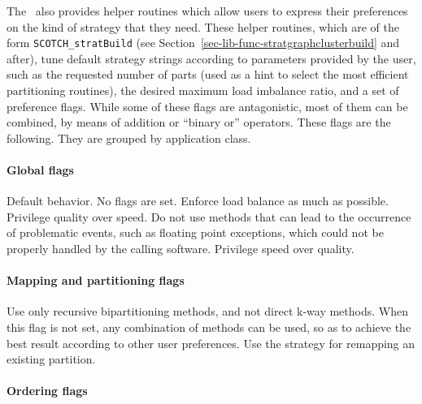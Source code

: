 The \libscotch\ also provides helper routines which allow users to
express their preferences on the kind of strategy that they
need. These helper routines, which are of the form
{\tt SCOTCH\_\lbt strat\lbt *\lbt Build} (see
Section~\ref{sec-lib-func-stratgraphclusterbuild} and after), tune
default strategy strings according to parameters provided by the user,
such as the requested number of parts (used as a hint to select the
most efficient partitioning routines), the desired maximum load
imbalance ratio, and a set of preference flags. While some of these
flags are antagonistic, most of them can be combined, by means of
addition or ``binary or'' operators. These flags are the following.
They are grouped by application class.

\paragraph{Global flags}

\begin{itemize}
Default behavior. No flags are set.
Enforce load balance as much as possible.
Privilege quality over speed.
Do not use methods that can lead to the occurrence of problematic
events, such as floating point exceptions, which could not be properly
handled by the calling software.
Privilege speed over quality.
\end{itemize}

\paragraph{Mapping and partitioning flags}

\begin{itemize}
Use only recursive bipartitioning methods, and not direct k-way
methods. When this flag is not set, any combination of methods can be
used, so as to achieve the best result according to other user
preferences.
Use the strategy for remapping an existing partition.
\end{itemize}

\paragraph{Ordering flags}

